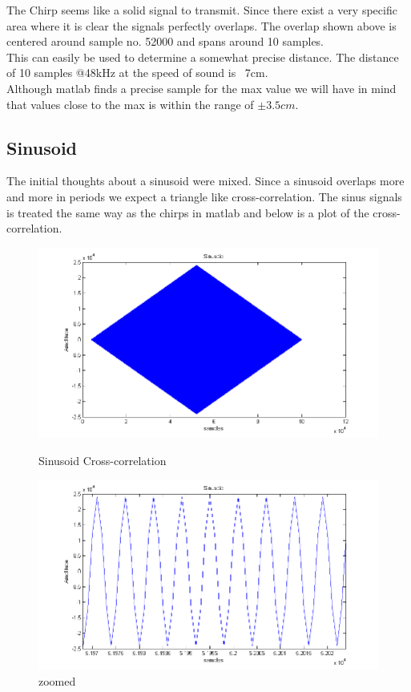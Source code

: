 The Chirp seems like a solid signal to transmit. Since there exist a very specific area where it is clear the signals perfectly overlaps. The overlap shown above is centered around sample no. 52000 and spans around 10 samples.\\
This can easily be used to determine a somewhat precise distance. The distance of 10 samples @48kHz at the speed of sound is ~7cm.\\
Although matlab finds a precise sample for the max value we will have in mind that values close to the max is within the range of $\pm 3.5cm$.\\
\subsection{Sinusoid}
The initial thoughts about a sinusoid were mixed. Since a sinusoid overlaps more and more in periods we expect a triangle like cross-correlation. The sinus signals is treated the same way as the chirps in matlab and below is a plot of the cross-correlation.
\begin{figure}[H]
\begin{minipage}[b]{0.49\linewidth}
\centering
\includegraphics[width=1\textwidth]{billeder/sinus_xcorr_fig}
\caption{Sinusoid Cross-correlation}
\label{fig:figure1}
\end{minipage}
\hspace{0.5cm}
\begin{minipage}[b]{0.49\linewidth}
\centering
\includegraphics[width=1\textwidth]{billeder/sinus_xcorr_fig_zoom}
\caption{zoomed}
\label{fig:figure2}
\end{minipage}
\end{figure}
